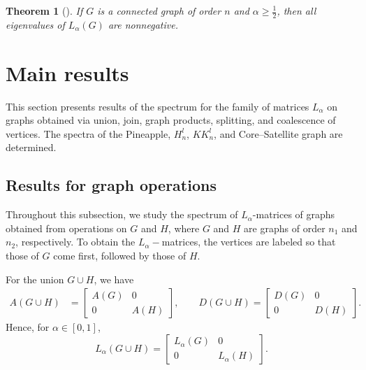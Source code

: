 \documentclass{article}
\newtheorem{theorem}{Theorem}[section]
\begin{document}
\begin{theorem}[\cite{Wang2020}]
If $G$ is a connected graph of order $n$ and $\alpha \ge \tfrac{1}{2}$, then all eigenvalues of $L_\alpha(G)$ are nonnegative.
\end{theorem}


\section{Main results}\label{sec3}

This section presents results of the spectrum for the family of matrices $L_\alpha$ on graphs obtained via union, join, graph products, splitting, and coalescence of vertices. The spectra of the Pineapple, $H_n^l$, $KK_n^l$, and Core–Satellite graph are determined.


\subsection{Results for graph operations}


Throughout this subsection, we study the spectrum of $L_{\alpha}$-matrices of graphs obtained from operations on $G$ and $H$, where $G$ and $H$ are graphs of order $n_1$ and $n_2$, respectively. To obtain the $L_{\alpha}-$matrices, the vertices are labeled so that those of $G$ come first, followed by those of $H$.

For the union $G \cup H$, we have
\begin{align*}
A(G \cup H) &= \begin{bmatrix} 
A(G) & 0 \\ 
0 & A(H) 
\end{bmatrix}, \qquad
D(G \cup H) = \begin{bmatrix} 
D(G) & 0 \\ 
0 & D(H) 
\end{bmatrix}.
\end{align*}
Hence, for $\alpha \in [0,1]$,
\begin{equation}\label{matriz_L_alpha_uniao}
L_\alpha(G \cup H) =
\begin{bmatrix} 
L_\alpha(G) & 0 \\ 
0 & L_\alpha(H) 
\end{bmatrix}.
\end{equation}
\end{document}

